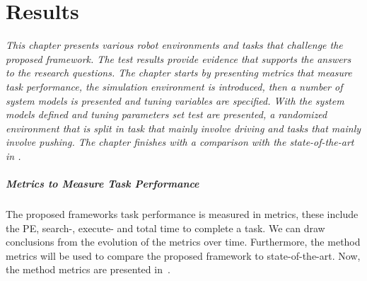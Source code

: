 \chapter{Results}%
\label{chap:results}
\textit{This chapter presents various robot environments and tasks that challenge the proposed framework. The test results provide evidence that supports the answers to the research questions. The chapter starts by presenting metrics that measure task performance, the simulation environment is introduced, then a number of system models is presented and tuning variables are specified. With the system models defined and tuning parameters set test are presented, a randomized environment that is split in task that mainly involve driving and tasks that mainly involve pushing. The chapter finishes with a comparison with the state-of-the-art in .\bs}

\paragraph{Metrics to Measure Task Performance}
The proposed frameworks task performance is measured in metrics, these include the \ac{PE}, search-, execute- and total time to complete a task. We can draw conclusions from the evolution of the metrics over time. Furthermore, the method metrics will be used to compare the proposed framework to state-of-the-art. Now, the method metrics are presented in~.\bs

